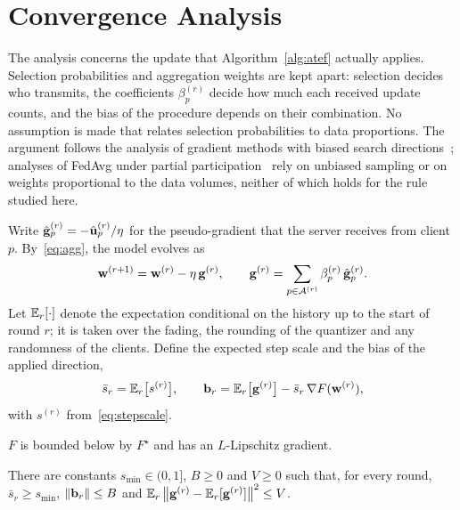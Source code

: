 \section{Convergence Analysis}
\label{sec:convergence}
\begin{revblock}The analysis concerns the update that Algorithm~\ref{alg:atef} actually applies. Selection probabilities and aggregation weights are kept apart: selection decides who transmits, the coefficients $\beta_p^{(r)}$ decide how much each received update counts, and the bias of the procedure depends on their combination. No assumption is made that relates selection probabilities to data proportions. The argument follows the analysis of gradient methods with biased search directions~\cite{ajalloeian2020convergence}; analyses of FedAvg under partial participation~\cite{wang2020tackling} rely on unbiased sampling or on weights proportional to the data volumes, neither of which holds for the rule studied here.

Write $\hat{\mathbf{g}}_p^{(r)}=-\hat{\mathbf{u}}_p^{(r)}/\eta$ for the pseudo-gradient that the server receives from client $p$. By~\eqref{eq:agg}, the model evolves as
\begin{equation}
	\mathbf{w}^{(r+1)}=\mathbf{w}^{(r)}-\eta\,\mathbf{g}^{(r)},\qquad \mathbf{g}^{(r)}=\sum_{p\in\mathcal{A}^{(r)}}\beta_p^{(r)}\,\hat{\mathbf{g}}_p^{(r)} .
	\label{eq:applied}
\end{equation}
Let $\mathbb{E}_r[\cdot]$ denote the expectation conditional on the history up to the start of round $r$; it is taken over the fading, the rounding of the quantizer and any randomness of the clients. Define the expected step scale and the bias of the applied direction,
\begin{equation}
	\bar s_r=\mathbb{E}_r\bigl[s^{(r)}\bigr],\qquad \mathbf{b}_r=\mathbb{E}_r\bigl[\mathbf{g}^{(r)}\bigr]-\bar s_r\,\nabla F(\mathbf{w}^{(r)}),
	\label{eq:biasdef}
\end{equation}
with $s^{(r)}$ from~\eqref{eq:stepscale}.

\begin{assumption}[Smoothness]
	\label{ass:smooth}
	$F$ is bounded below by $F^{\star}$ and has an $L$-Lipschitz gradient.
\end{assumption}

\begin{assumption}
	\label{ass:update}
	There are constants $s_{\min}\in(0,1]$, $B\ge 0$ and $V\ge 0$ such that, for every round, $\bar s_r\ge s_{\min}$, $\left\lVert \mathbf{b}_r \right\rVert\le B$ and $\mathbb{E}_r\left\lVert \mathbf{g}^{(r)}-\mathbb{E}_r[\mathbf{g}^{(r)}] \right\rVert^2\le V$.
\end{assumption}


\end{revblock}
